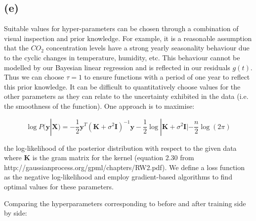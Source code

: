 \documentclass[12pt]{article}
\begin{document}
\subsection*{(e)}
Suitable values for hyper-parameters can be chosen through a combination of visual inspection and prior knowledge.
For example, it is a reasonable assumption that the $CO_2$ concentration levels have a strong yearly seasonality behaviour due to the cyclic changes in temperature, humidity, etc.
This behaviour cannot be modelled by our Bayesian linear regression and is reflected in our residuals $g(t)$.
Thus we can choose $\tau=1$ to ensure functions with a period of one year to reflect this prior knowledge.
It can be difficult to quantitatively choose values for the other parameters as they can relate to the uncertainty exhibited in the data (i.e. the smoothness of the function).
One approach is to maximise:

\[\log P(\textbf{y} | \textbf{X}) = -\frac{1}{2} \textbf{y}^T (\textbf{K} + \sigma^2\textbf{I})^{-1} \textbf{y} - \frac{1}{2} \log |\textbf{K}+ \sigma^2\textbf{I}| - \frac{n}{2}\log(2\pi)\]

the log-likelihood  of the posterior distribution with respect to the given data where $\textbf{K}$ is the gram matrix for the kernel (equation 2.30 from http://gaussianprocess.org/gpml/chapters/RW2.pdf).
We define a loss function as the negative log-likelihood and employ gradient-based algorithms to find optimal values for these parameters.

Comparing the hyperparameters corresponding to before and after training side by side:
\end{document}
